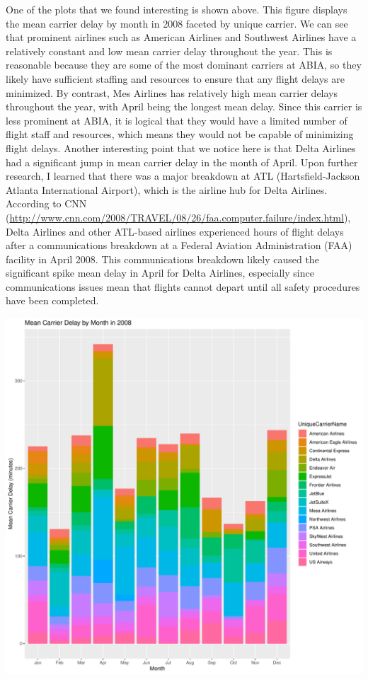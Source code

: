 \documentclass[]{article}
\begin{document}
One of the plots that we found interesting is shown above. This figure
displays the mean carrier delay by month in 2008 faceted by unique
carrier. We can see that prominent airlines such as American Airlines
and Southwest Airlines have a relatively constant and low mean carrier
delay throughout the year. This is reasonable because they are some of
the most dominant carriers at ABIA, so they likely have sufficient
staffing and resources to ensure that any flight delays are minimized.
By contrast, Mes Airlines has relatively high mean carrier delays
throughout the year, with April being the longest mean delay. Since this
carrier is less prominent at ABIA, it is logical that they would have a
limited number of flight staff and resources, which means they would not
be capable of minimizing flight delays. Another interesting point that
we notice here is that Delta Airlines had a significant jump in mean
carrier delay in the month of April. Upon further research, I learned
that there was a major breakdown at ATL (Hartsfield-Jackson Atlanta
International Airport), which is the airline hub for Delta Airlines.
According to CNN
(\url{http://www.cnn.com/2008/TRAVEL/08/26/faa.computer.failure/index.html}),
Delta Airlines and other ATL-based airlines experienced hours of flight
delays after a communications breakdown at a Federal Aviation
Administration (FAA) facility in April 2008. This communications
breakdown likely caused the significant spike mean delay in April for
Delta Airlines, especially since communications issues mean that flights
cannot depart until all safety procedures have been completed.

\includegraphics{Report_files/figure-latex/abia3-1.pdf}
\end{document}

